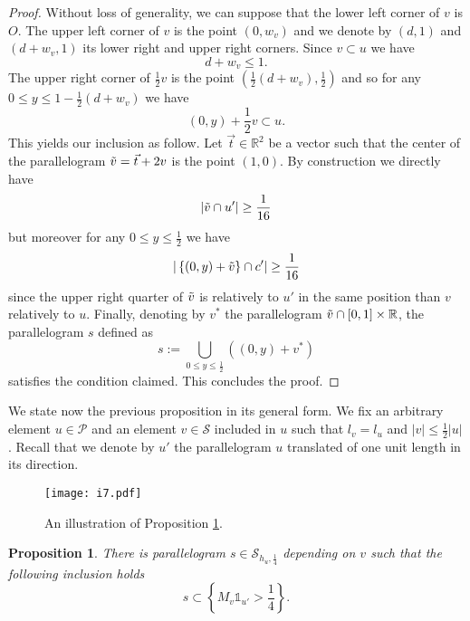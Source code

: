 \documentclass{article}
\newtheorem{prp}{Proposition}
\begin{document}
\begin{proof}

Without loss of generality, we can suppose that the lower left corner of $v$ is $O$. The upper left corner of $v$ is the point $(0,w_v)$ and we denote by $(d,1)$ and $(d+w_v,1)$ its lower right and upper right corners. Since $v \subset u$ we have $$d + w_v \leq 1.$$ The upper right corner of $\frac{1}{2}v$ is the point $(\frac{1}{2} (d + w_v), \frac{1}{2})$ and so for any $0 \leq y \leq 1 - \frac{1}{2}(d+w_v) $ we have $$(0,y) + \frac{1}{2}v \subset u.$$ This yields our inclusion as follow. Let $\Vec{t} \in \mathbb{R}^2$ be a vector such that the center of the parallelogram $\Tilde{v} = \Vec{t} + 2v$ is the point $(1,0)$. By construction we directly have $$| \Tilde{v} \cap u'| \geq \frac{1}{16}$$ but moreover for any $0 \leq y \leq \frac{1}{2}$ we have $$|  \left\{ (0,y) + \Tilde{v} \right\}  \cap c'| \geq \frac{1}{16}$$ since the upper right quarter of $\Tilde{v}$ is relatively to $u'$ in the same position than $v$ relatively to $u$. Finally, denoting by $v^*$ the parallelogram $\Tilde{v} \cap [0,1] \times \mathbb{R} $, the parallelogram $s$ defined as $$s := \bigcup_{0 \leq y \leq  \frac{1}{2}} \left( (0,y) + v^* \right)  $$ satisfies the condition claimed. This concludes the proof.
\end{proof}




We state now the previous proposition in its general form. We fix an arbitrary element $u \in \mathcal{P}$ and an element $v \in \mathcal{S}$ included in $u$ such that $l_v = l_u$ and $|v| \leq \frac{1}{2}|u|$. Recall that we denote by $u'$ the parallelogram $u$ translated of one unit length in its direction.
  
\begin{figure}[h!]
\centering
\texttt{[image: i7.pdf]}
\caption{An illustration of Proposition \ref{L : final lemma ge}.}  
\end{figure}
 
\begin{prp}\label{L : final lemma ge}
There is parallelogram $s \in \mathcal{S}_{ h_u,\frac{1}{4}}$ depending on $v$ such that the following inclusion holds $$  s \subset \left\{ M_v \mathbb{1}_{u'} > \frac{1}{4} \right\}.$$
\end{prp}
\end{document}

